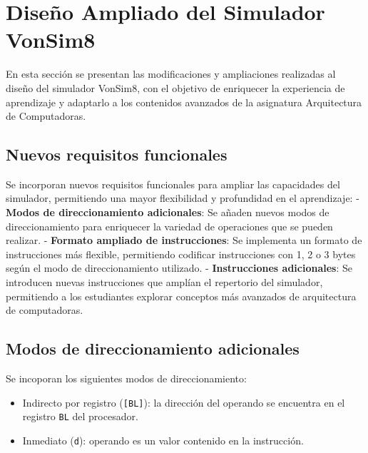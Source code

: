\documentclass[12pt,oneside]{templates/unerthesis}
\providecommand{\tightlist}{%
  \setlength{\itemsep}{0pt}\setlength{\parskip}{0pt}}
\begin{document}
\hypertarget{diseuxf1o-ampliado-del-simulador-vonsim8}{%
\section{Diseño Ampliado del Simulador VonSim8}\label{diseuxf1o-ampliado-del-simulador-vonsim8}}

En esta sección se presentan las modificaciones y ampliaciones realizadas al diseño del simulador VonSim8, con el objetivo de enriquecer la experiencia de aprendizaje y adaptarlo a los contenidos avanzados de la asignatura Arquitectura de Computadoras.

\hypertarget{nuevos-requisitos-funcionales}{%
\subsection{Nuevos requisitos funcionales}\label{nuevos-requisitos-funcionales}}

Se incorporan nuevos requisitos funcionales para ampliar las capacidades del simulador, permitiendo una mayor flexibilidad y profundidad en el aprendizaje:
- \textbf{Modos de direccionamiento adicionales}: Se añaden nuevos modos de direccionamiento para enriquecer la variedad de operaciones que se pueden realizar.
- \textbf{Formato ampliado de instrucciones}: Se implementa un formato de instrucciones más flexible, permitiendo codificar instrucciones con 1, 2 o 3 bytes según el modo de direccionamiento utilizado.
- \textbf{Instrucciones adicionales}: Se introducen nuevas instrucciones que amplían el repertorio del simulador, permitiendo a los estudiantes explorar conceptos más avanzados de arquitectura de computadoras.

\hypertarget{modos-de-direccionamiento-adicionales}{%
\subsection{Modos de direccionamiento adicionales}\label{modos-de-direccionamiento-adicionales}}

Se incoporan los siguientes modos de direccionamiento:

\begin{itemize}
\tightlist
\item
  Indirecto por registro (\texttt{{[}BL{]}}): la dirección del operando se encuentra en el registro \texttt{BL} del procesador.
\item
  Inmediato (\texttt{d}): operando es un valor contenido en la instrucción.
\end{itemize}
\end{document}
